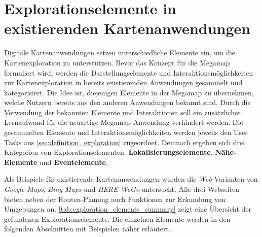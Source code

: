 \section{Explorationselemente in existierenden Kartenanwendungen}
\label{sec:exploration_elements}
Digitale Kartenanwendungen setzen unterschiedliche Elemente ein, um die Kartenexploration zu unterstützen.
Bevor das Konzept für die Megamap formuliert wird, werden die Darstellungselemente und Interaktionsmöglichkeiten zur Kartenexploration in bereits existierenden Anwendungen gesammelt und kategorisiert.
Die Idee ist, diejenigen Elemente in der Megamap zu übernehmen, welche Nutzern bereits aus den anderen Anwendungen bekannt sind.
Durch die Verwendung der bekannten Elemente und Interaktionen soll ein zusätzlicher Lernaufwand für die neuartige Megamap-Anwendung verhindert werden.
Die gesammelten Elemente und Interaktionsmöglichkeiten werden jeweils den User Tasks aus \autoref{sec:definition_exploration} zugeordnet.
Demnach ergeben sich drei Kategorien von Explorationselementen: \textbf{Lokalisierungselemente}, \textbf{Nähe-Elemente} und \textbf{Eventelemente}.

Als Beispiele für existierende Kartenanwendungen wurden die \emph{Web}-Varianten von \emph{Google Maps}, \emph{Bing Maps} \parencite{Microsoft2018b} und \emph{HERE WeGo} \parencite{HERE2018} untersucht.
Alle drei Webseiten bieten neben der Routen-Planung auch Funktionen zur Erkundung von Umgebungen an.
\autoref{tab:exploration_elements_summary} zeigt eine Übersicht der gefundenen Explorationselemente.
Die einzelnen Elemente werden in den folgenden Abschnitten mit Beispielen näher erläutert.

